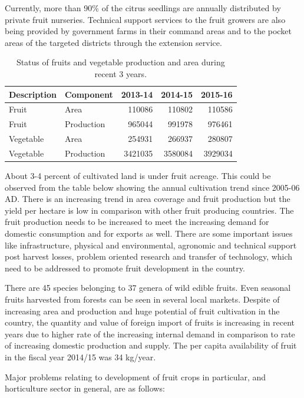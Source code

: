 \documentclass[
  openany]{book}
\begin{document}
Currently, more than 90\% of the citrus seedlings are annually distributed by private fruit nurseries. Technical support services to the fruit growers are also being provided by government farms in their command areas and to the pocket areas of the targeted districts through the extension service.

\begin{table}

\caption{\label{tab:horticulture-fruits-veg}Status of fruits and vegetable production and area during recent 3 years.}
\centering
\begin{tabular}[t]{llrrr}
\toprule
Description & Component & 2013-14 & 2014-15 & 2015-16\\
\midrule
Fruit & Area & 110086 & 110802 & 110586\\
Fruit & Production & 965044 & 991978 & 976461\\
Vegetable & Area & 254931 & 266937 & 280807\\
Vegetable & Production & 3421035 & 3580084 & 3929034\\
\bottomrule
\end{tabular}
\end{table}

About 3-4 percent of cultivated land is under fruit acreage. This could be observed from the table below showing the annual cultivation trend since 2005-06 AD. There is an increasing trend in area coverage and fruit production but the yield per hectare is low in comparison with other fruit producing countries. The fruit production needs to be increased to meet the increasing demand for domestic consumption and for exports as well. There are some important issues like infrastructure, physical and environmental, agronomic and technical support post harvest losses, problem oriented research and transfer of technology, which need to be addressed to promote fruit development in the country.

There are 45 species belonging to 37 genera of wild edible fruits. Even seasonal fruits harvested from forests can be seen in several local markets. Despite of increasing area and production and huge potential of fruit cultivation in the country, the quantity and value of foreign import of fruits is increasing in recent years due to higher rate of the increasing internal demand in comparison to rate of increasing domestic production and supply. The per capita availability of fruit in the fiscal year 2014/15 was 34 kg/year.

Major problems relating to development of fruit crops in particular, and horticulture sector in general, are as follows:
\end{document}
